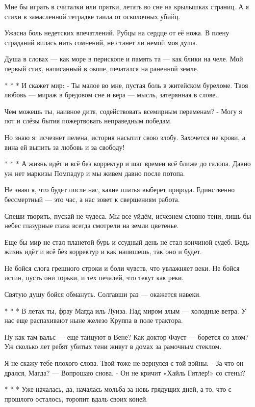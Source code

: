 Мне бы играть в считалки или прятки,
летать во сне на крылышках страниц.
А я стихи в замасленной тетрадке
таила от осколочных убийц.

Ужасна боль недетских впечатлений.
Рубцы на сердце от её ножа.
В плену страданий вилась нить сомнений,
не станет ли немой моя душа.

Душа в словах --- как море в перископе
и память та --- как блики на челе.
Мой первый стих, написанный в окопе,
печатался на раненной земле.

* * *
И скажет мир: - Ты малое во мне,
пустая боль в житейском буреломе.
Твоя любовь --- мираж в бредовом сне
и вера --- мысль, затерянная в слове.

Чем можешь ты, наивное дитя,
содействовать всемирным переменам?
- Могу я пот и слёзы бытия
пожертвовать неправедным победам.

Но знаю я: исчезнет пелена,
история насытит свою злобу.
Захочется не крови, а вина
ей выпить за любовь и за свободу!

* * *
А жизнь идёт и всё без корректур
и шаг времен всё ближе до галопа.
Давно уж нет маркизы Помпадур
и мы  живем давно после потопа.

Не знаю я, что будет после нас,
какие платья выберет природа.
Единственно бессмертный --- это час,
а нас зовет к свершениям работа.

Спеши творить, пускай не чудеса.
Мы все уйдём, исчезнем словно тени,
лишь бы небес глазурные глаза
всегда смотрели на земли цветенье.

Еще бы мир не стал планетой бурь
и ссудный день не стал кончиной судеб.
Ведь жизнь идёт и всё без корректур
и как напишешь, так оно и будет.

Не бойся слога грешного строки
и боли чувств, что увлажняет веки.
Не бойся истин, пусть они горьки,
и тех печалей, что текут как реки.

Святую душу бойся обмануть.
Солгавши раз --- окажется навеки.

* * *
В летах ты, фрау Магда иль Луиза.
Над миром злым --- холодные ветра.
У нас еще распахивают ныне
железо Круппа в поле трактора.

Ну как там вальс --- еще танцуют в Вене?
Как доктор Фауст --- борется со злом?
Уж сколько лет ребят убитых тени
живут в домах за рамочным стеклом.

Я не скажу тебе плохого слова.
Твой тоже не вернулся с той войны.
- За что он дрался, Магда? --- Вопрошаю снова.
- Он не кричит «Хайль Гитлер!» со стены?

* * *
Уже началась, да, началась
мольба за новь  грядущих дней,
а то, что с прошлого осталось,
торопит вдаль своих коней.

